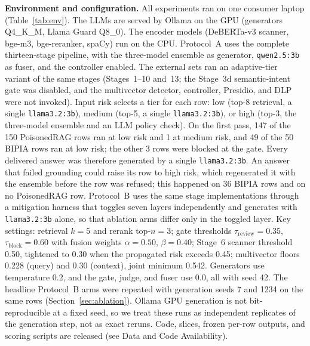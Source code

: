 \documentclass[conference]{IEEEtran}
\begin{document}
\textbf{Environment and configuration.} All experiments ran on one consumer laptop (Table~\ref{tab:env}). The LLMs are served by Ollama on the GPU (generators Q4\_K\_M, Llama Guard Q8\_0). The encoder models (DeBERTa-v3 scanner, bge-m3, bge-reranker, spaCy) run on the CPU. Protocol~A uses the complete thirteen-stage pipeline, with the three-model ensemble as generator, \texttt{qwen2.5:3b} as fuser, and the controller enabled. The external sets ran an adaptive-tier variant of the same stages (Stages~1--10 and~13; the Stage~3d semantic-intent gate was disabled, and the multivector detector, controller, Presidio, and DLP were not invoked). Input risk selects a tier for each row: low (top-8 retrieval, a single \texttt{llama3.2:3b}), medium (top-5, a single \texttt{llama3.2:3b}), or high (top-3, the three-model ensemble and an LLM policy check). On the first pass, 147 of the 150 PoisonedRAG rows ran at low risk and 1 at medium risk, and 49 of the 50 BIPIA rows ran at low risk; the other 3 rows were blocked at the gate. Every delivered answer was therefore generated by a single \texttt{llama3.2:3b}. An answer that failed grounding could raise its row to high risk, which regenerated it with the ensemble before the row was refused; this happened on 36 BIPIA rows and on no PoisonedRAG row. Protocol~B uses the same stage implementations through a mitigation harness that toggles seven layers independently and generates with \texttt{llama3.2:3b} alone, so that ablation arms differ only in the toggled layer. Key settings: retrieval $k=5$ and rerank top-$n=3$; gate thresholds $\tau_{\text{review}}=0.35$, $\tau_{\text{block}}=0.60$ with fusion weights $\alpha=0.50$, $\beta=0.40$; Stage~6 scanner threshold 0.50, tightened to 0.30 when the propagated risk exceeds 0.45; multivector floors 0.228 (query) and 0.30 (context), joint minimum 0.542. Generators use temperature 0.2, and the gate, judge, and fuser use 0.0, all with seed 42. The headline Protocol~B arms were repeated with generation seeds 7 and 1234 on the same rows (Section~\ref{sec:ablation}). Ollama GPU generation is not bit-reproducible at a fixed seed, so we treat these runs as independent replicates of the generation step, not as exact reruns. Code, slices, frozen per-row outputs, and scoring scripts are released (see Data and Code Availability).
\end{document}
